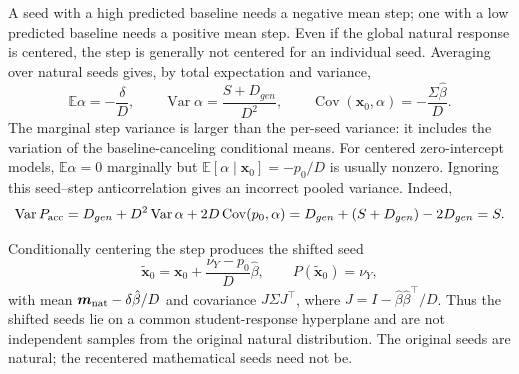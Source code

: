\documentclass[11pt]{article}
\newcommand{\E}{\mathbb E}
\newcommand{\Var}{\operatorname{Var}}
\newcommand{\Cov}{\operatorname{Cov}}
\newcommand{\bhat}{\hat{\beta}}
\newcommand{\x}{\mathbf{x}}
\begin{document}
A seed with a high predicted baseline needs a negative mean step; one with a
low predicted baseline needs a positive mean step. Even if the global natural
response is centered, the step is generally not centered for an individual
seed. Averaging over natural seeds gives, by total expectation and variance,
\begin{equation}\boxed{
 \E\alpha=-\frac{\delta}{D},\qquad
 \Var\alpha=\frac{S+D_{gen}}{D^2},\qquad
 \Cov(\x_0,\alpha)=-\frac{\Sigma\bhat}{D}.}
 \label{eq:matching-marginal}
\end{equation}
The marginal step variance is larger than the per-seed variance: it includes
the variation of the baseline-canceling conditional means. For centered
zero-intercept models, $\E\alpha=0$ marginally but
$\E[\alpha\mid\x_0]=-p_0/D$ is usually nonzero.
Ignoring this seed--step anticorrelation gives an incorrect pooled variance.
Indeed,
\[
 \Var P_{\rm acc}=D_{gen}+D^2\Var\alpha
                  +2D\Cov(p_0,\alpha)=D_{gen}+(S+D_{gen})-2D_{gen}=S.
\]

Conditionally centering the step produces the shifted seed
\[
 \widetilde{\x}_0=\x_0+\frac{\nu_Y-p_0}{D}\bhat,
 \qquad P(\widetilde{\x}_0)=\nu_Y,
\]
with mean $\bm m_{\rm nat}-\delta\bhat/D$ and covariance
$J\Sigma J^\top$, where $J=I-\bhat\bhat^\top/D$.
Thus the shifted seeds lie on a common student-response hyperplane and are
not independent samples from the original natural distribution. The original
seeds are natural; the recentered mathematical seeds need not be.
\end{document}
